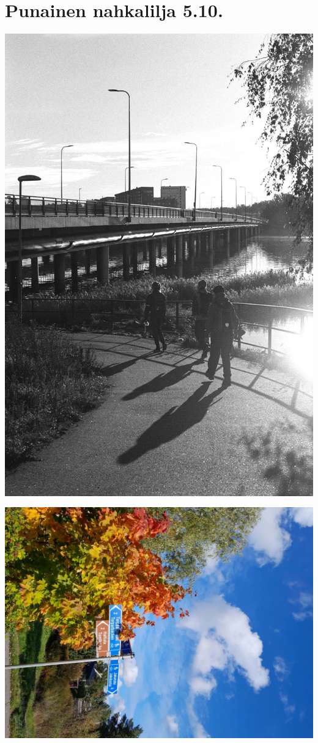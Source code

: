 \section{Punainen nahkalilja 5.10.}

\begin{multicols}{2}
\noindent\includegraphics[width=\linewidth,trim={0 3cm 0 6.75cm},clip]{assets/nahkaliljapunainen1.jpg}

\vfill

\noindent\includegraphics[width=\linewidth,trim={0 0 0 2cm},clip]{assets/nahkaliljapunainen2.jpg}


\end{multicols}
